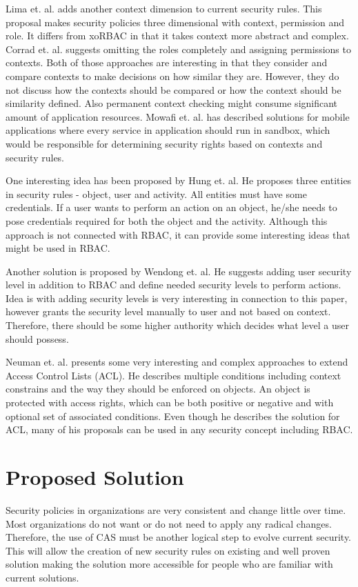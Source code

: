 \documentclass{sig-alternate-05-2015}
\begin{document}
Lima et. al. \cite{contextlayer} adds another context dimension to current security rules. This proposal makes security policies three dimensional with context, permission and role. It differs from xoRBAC \cite{xorbac} in that it takes context more abstract and complex. Corrad et. al. \cite{ubiscom} suggests omitting the roles completely and assigning permissions to contexts. Both of those approaches are interesting in that they consider and compare contexts to make decisions on how similar they are. However,  they do not discuss how the contexts should be compared or how the context should be similarity defined. Also permanent context checking might consume significant amount of application resources. Mowafi et. al. \cite{contextAwareMobile} has described solutions for mobile applications where every service in application should run in sandbox, which would be responsible for determining security rights based on contexts and security rules.

One interesting idea has been proposed by Hung et. al. \cite{hung} He proposes three entities in security rules - object, user and activity. All entities must have some credentials. If a user wants to perform an action on an object, he/she needs to pose credentials required for both the object and the activity. Although this approach is not connected with RBAC, it can provide some interesting ideas that might be used in RBAC.

Another solution is proposed by Wendong et. al. \cite{wendong} He suggests adding user security level in addition to RBAC and define needed security levels to perform actions. Idea is with adding security levels is very interesting in connection to this paper, however grants the security level manually to user and not based on context. Therefore, there should be some higher authority which decides what level a user should possess.

Neuman et. al. \cite{eacl} presents some very interesting and complex approaches to extend Access Control Lists (ACL). He describes multiple conditions including context constrains and the way they should be enforced on objects. An object is protected with access rights, which can be both positive or negative and with optional set of associated conditions. Even though he describes the solution for ACL, many of his proposals can be used in any security concept including RBAC.

\section{Proposed Solution}
Security policies in organizations are very consistent and change little over time. Most organizations do not want or do not need to apply any radical changes. Therefore, the use of CAS must be another logical step to evolve current security. This will allow the creation of new security rules on existing and well proven solution making the solution more accessible for people who are familiar with current solutions.
\end{document}
